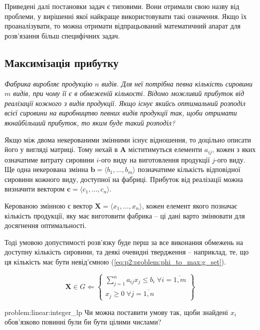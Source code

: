\documentclass[\main/book.tex]{subfiles}
\begin{document}
Приведені далі постановки задач є типовими. Вони отримали свою назву від проблеми, у вирішенні якої найкраще використовувати такі означення. Якщо їх проаналізувати, то можна отримати відпрацьований математичний апарат для розв'язання більш специфічних задач.

\subsection{Максимізація прибутку}
\label{section:linear:phi_to_max}

\textit{Фабрика виробляє продукцію $n$ видів. Для неї потрібна певна кількість сировини $m$ видів, при чому її є в обмеженій кількості. Відомо можливий прибуток від реалізації кожного з видів продукції. Якщо існує якийсь оптимальний розподіл всієї сировини на виробництво певних видів продукції так, щоби отримати якнайбільший прибуток, то яким буде такий розподіл?}

Якщо між двома некерованими змінними існує відношення, то доцільно описати його у вигляді матриці. Тому нехай в $\mathbf{A}$ міститимуться елементи $a_{ij}$, кожен з яких означатиме витрату сировини $i$-ого виду на виготовлення продукції $j$-ого виду. Ще одна некерована змінна $\mathbf{b} = \langle b_1, \ldots, b_m \rangle$ позначатиме кількість відповідної сировини кожного виду, доступної на фабриці. Прибуток від реалізації можна визначити вектором $\mathbf{c} = \langle c_1, \ldots, c_n \rangle$.

Керованою змінною є вектор $\mathbf{X} = \langle x_1, \ldots, x_n \rangle$, кожен елемент якого позначає кількість продукції, яку має виготовити фабрика -- ці дані варто змінювати для досягнення оптимальності.

Тоді умовою допустимості розв'язку буде перш за все виконання обмежень на доступну кількість сировини, та деякі очевидні твердження -- наприклад, те, що ця кількість має бути невід'ємною (\ref{eq:p2:problem:phi_to_max:g_set}).

\begin{equation}
 \mathbf{X} \in G \Leftarrow
 \left\{
  \begin{array}{l}
   \displaystyle \sum_{j=1}^n a_{ij} x_j \leq b_i\;
   \forall i = \overline{1, m} \\
   x_j \geq 0 \; \forall j = \overline{1, n}
  \end{array}
 \right\}
 \label{eq:p2:problem:phi_to_max:g_set}
\end{equation}

\begin{problem}{problem:linear:integer_lp}
Чи можна поставити умову так, щоби знайдені $x_i$ обов'язково повинні були би бути цілими числами?
\end{problem}
\end{document}
